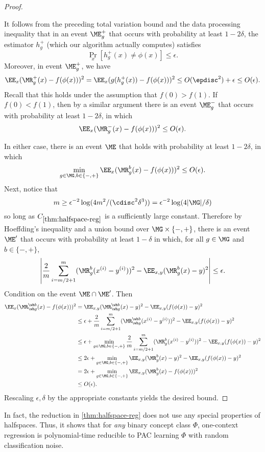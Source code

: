 \begin{proof}
\begin{enumerate}
It follows from the preceding total variation bound and the data processing inequality that in an event $\ME_g^+$ that occurs with probability at least $1-2\delta$, the estimator $h_g^+$ (which our algorithm actually computes) satisfies
\[\Pr_x[h_g^+(x) \neq \phi(x)] \leq \epsilon.\]
Moreover, in event $\ME_g^+$, we have
\[\EE_x (\MR_g^+(x) - f(\phi(x)))^2 = \EE_x (g(h_g^+(x)) - f(\phi(x)))^2 \leq O(\epdisc^2) + \epsilon \leq O(\epsilon).\]
Recall that this holds under the assumption that $f(0) > f(1)$. If $f(0) < f(1)$, then by a similar argument there is an event $\ME_g^-$ that occurs with probability at least $1-2\delta$, in which 
\[\EE_x (\MR_g^-(x) - f(\phi(x)))^2 \leq O(\epsilon).\]
\end{enumerate}
In either case, there is an event $\ME$ that holds with probability at least $1-2\delta$, in which 
\[\min_{g \in \MG, b \in \{-,+\}} \EE_x(\MR_g^b(x) - f(\phi(x)))^2 \leq O(\epsilon).\]
Next, notice that \[m \geq \epsilon^{-2} \log(4m^2/(\cdisc^2 \delta^3)) = \epsilon^{-2} \log(4|\MG|/\delta)\]
so long as $C_{\ref{thm:halfspace-reg}}$ is a sufficiently large constant. Therefore by Hoeffding's inequality and a union bound over $\MG \times \{-,+\}$, there is an event $\ME'$ that occurs with probability at least $1-\delta$ in which, for all $g \in \MG$ and $b \in \{-,+\}$,
\[\left| \frac{2}{m}\sum_{i=m/2+1}^m (\MR_g^b(x^{(i)} - y^{(i)}))^2 - \EE_{x,y}(\MR_g^b(x) - y)^2\right| \leq \epsilon.\]
Condition on the event $\ME \cap \ME'$. Then
\begin{align*}
\EE_x (\MR_{\wh g}^{\wh b}(x) - f(\phi(x)))^2 
&= \EE_{x,y} (\MR_{\wh g}^{\wh b}(x) - y)^2 - \EE_{x,y} (f(\phi(x)) - y)^2 \\ 
&\leq \epsilon + \frac{2}{m}\sum_{i=m/2+1}^m (\MR_{\wh g}^{\wh b}(x^{(i)} - y^{(i)}))^2 - \EE_{x,y} (f(\phi(x)) - y)^2 \\ 
&\leq \epsilon + \min_{g\in\MG,b\in\{-,+\}}\frac{2}{m}\sum_{i=m/2+1}^m (\MR_{g}^{b}(x^{(i)} - y^{(i)}))^2 - \EE_{x,y} (f(\phi(x)) - y)^2 \\ 
&\leq 2\epsilon + \min_{g\in\MG,b\in\{-,+\}} \EE_{x,y} (\MR_g^b(x) - y)^2 - \EE_{x,y} (f(\phi(x)) - y)^2 \\
&= 2\epsilon + \min_{g\in\MG,b\in\{-,+\}} \EE_{x,y} (\MR_g^b(x) - f(\phi(x)))^2 \\ 
&\leq O(\epsilon).
\end{align*}
Rescaling $\epsilon,\delta$ by the appropriate constants yields the desired bound.
\end{proof}

\begin{remark}\label{remark:ocr-to-pac}
In fact, the reduction in \cref{thm:halfspace-reg} does not use any special properties of halfspaces. Thus, it shows that for \emph{any} binary concept class $\Phi$, one-context regression is polynomial-time reducible to PAC learning $\Phi$ with random classification noise.
\end{remark}


